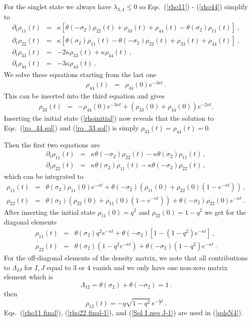 \documentclass[11pt,twoside,A4]{article}
\def\beqn{\begin{eqnarray}}
\def\eeqn{\end{eqnarray}}
\begin{document}
For the singlet state we always have $\lambda_{3,4}\le0$
so Eqs.\ (\ref{rho11}) - (\ref{rho44}) simplify to
\beqn
\partial_{t}\rho_{11}(t) &=&\kappa\left[\theta(-\sigma_{2})\rho_{22}(t)+\rho_{33}(t)+\rho_{44}(t)-\theta(\sigma_{2})\rho_{11}(t)\right]~, \\
\partial_{t}\rho_{22}(t) &=&\kappa\left[\theta(\sigma_{2})\rho_{11}(t)-\theta(-\sigma_{2})\rho_{22}(t)+\rho_{33}(t)+\rho_{44}(t)\right]~,\\
\partial_{t}\rho_{33}(t) &=& -2\kappa\rho_{33}(t)+\kappa\rho_{44}(t)~,\\
\partial_{t}\rho_{44}(t) &=& -3\kappa\rho_{44}(t)~.
\eeqn
We solve these equations starting from the last one 
\beqn
\rho_{44}(t) &=& \rho_{44}(0)e^{-3\kappa t}\label{ro_44 sol}~.
\eeqn
This can be inserted into the third equation and gives
\beqn
\rho_{33}(t) &=& -\rho_{44}(0)e^{-3\kappa t}+\left(\rho_{33}(0)+\rho_{44}(0)\right)e^{-2\kappa t}.\label{ro_33 sol}
\eeqn
Inserting the initial state (\ref{rhoinitial}) now reveals that the solution to Eqs.\ (\ref{ro_44 sol})
and (\ref{ro_33 sol}) is simply $\rho_{33}(t)=\rho_{44}(t)=0$.

Then the first two equations are
\beqn
\partial_{t}\rho_{11}(t) &=&\kappa\theta(-\sigma_{2})\rho_{22}(t)-\kappa\theta(\sigma_{2})\rho_{11}(t)~,\\
\partial_{t}\rho_{22}(t) &=&\kappa\theta(\sigma_{2})\rho_{11}(t)-\kappa\theta(-\sigma_{2})\rho_{22}(t)~,
\eeqn
which can be integrated to
\beqn
\rho_{11}(t) &=& \theta(\sigma_2) \rho_{11}(0)e^{-\kappa t} + \theta(-\sigma_2) \left( \rho_{11}(0)+\rho_{22}(0)\left(1-e^{-\kappa t}\right) \right)~,\\
\rho_{22}(t) &=& \theta(\sigma_2) \left( \rho_{22}(0)+\rho_{11}(0)\left(1-e^{-\kappa t}\right) \right) + \theta(-\sigma_2) \rho_{22}(0)e^{-\kappa t} ~.
\eeqn
After inserting the initial state $\rho_{11}(0)=q^{2}$ and $\rho_{22}(0)=1-q^{2}$
we get for the diagonal elements
\beqn
\rho_{11}(t) &=&\theta(\sigma_{2})q^{2}e^{-\kappa t}+\theta(-\sigma_{2})\left[1-(1-q^{2})e^{-\kappa t}\right]\label{rho11 final}~,\\
\rho_{22}(t) &=&\theta(\sigma_{2})\left(1-q^{2}e^{-\kappa t}\right)+ \theta(-\sigma_{2})\left(1-q^{2}\right)e^{-\kappa t}\label{rho22 final-1}~.
\eeqn
For the off-diagonal elements of the density matrix, we note that all contributions to $\Lambda_{IJ}$ for $I,J$ equal to $3$ or $4$ vanish and we only have one non-zero matrix element which is
\begin{equation}
\Lambda_{12}=\theta(\sigma_{2})+\theta(-\sigma_{2})=1~.
\end{equation}
then
\begin{equation}
\rho_{12}(t)=-q\sqrt{1-q^{2}}\,e^{-\frac{\kappa}{2}t}\label{Sol I neq J-1}~.
\end{equation}
Eqs.\ (\ref{rho11 final}), (\ref{rho22 final-1}), and (\ref{Sol I neq J-1}) are used in (\ref{solsN4}). 
\end{document}
